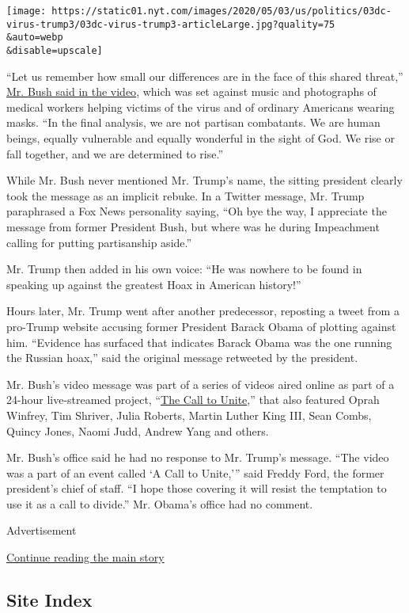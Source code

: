 \texttt{[image: https://static01.nyt.com/images/2020/05/03/us/politics/03dc-virus-trump3/03dc-virus-trump3-articleLarge.jpg?quality=75\\\&auto=webp\\\&disable=upscale]}

``Let us remember how small our differences are in the face of this
shared threat,''
\href{https://twitter.com/TheBushCenter/status/1256607729151619073}{Mr.
Bush said in the video}, which was set against music and photographs of
medical workers helping victims of the virus and of ordinary Americans
wearing masks. ``In the final analysis, we are not partisan combatants.
We are human beings, equally vulnerable and equally wonderful in the
sight of God. We rise or fall together, and we are determined to rise.''

While Mr. Bush never mentioned Mr. Trump's name, the sitting president
clearly took the message as an implicit rebuke. In a Twitter message,
Mr. Trump paraphrased a Fox News personality saying, ``Oh bye the way, I
appreciate the message from former President Bush, but where was he
during Impeachment calling for putting partisanship aside.''

Mr. Trump then added in his own voice: ``He was nowhere to be found in
speaking up against the greatest Hoax in American history!''

Hours later, Mr. Trump went after another predecessor, reposting a tweet
from a pro-Trump website accusing former President Barack Obama of
plotting against him. ``Evidence has surfaced that indicates Barack
Obama was the one running the Russian hoax,'' said the original message
retweeted by the president.

Mr. Bush's video message was part of a series of videos aired online as
part of a 24-hour live-streamed project, ``\href{https://unite.us/}{The
Call to Unite},'' that also featured Oprah Winfrey, Tim Shriver, Julia
Roberts, Martin Luther King III, Sean Combs, Quincy Jones, Naomi Judd,
Andrew Yang and others.

Mr. Bush's office said he had no response to Mr. Trump's message. ``The
video was a part of an event called `A Call to Unite,''' said Freddy
Ford, the former president's chief of staff. ``I hope those covering it
will resist the temptation to use it as a call to divide.'' Mr. Obama's
office had no comment.

Advertisement

\protect\hyperlink{after-bottom}{Continue reading the main story}

\hypertarget{site-index}{%
\subsection{Site Index}\label{site-index}}


